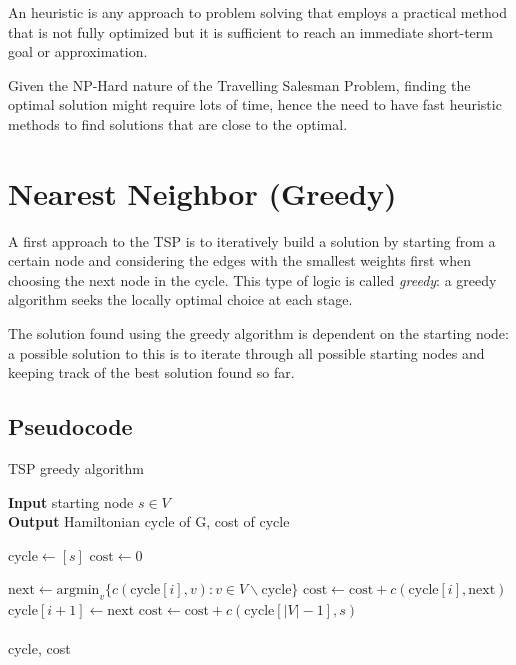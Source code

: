 An heuristic is any approach to problem solving that employs a practical method that is not fully optimized but it is sufficient to reach an immediate short-term goal or approximation.

Given the NP-Hard nature of the Travelling Salesman Problem, finding the optimal solution might require lots of time, hence the need to have fast heuristic methods to find solutions that are close to the optimal.

\section{Nearest Neighbor (Greedy)}

A first approach to the TSP is to iteratively build a solution by starting from a certain node and considering the edges with the smallest weights first when choosing the next node in the cycle. This type of logic is called \textit{greedy}: a greedy algorithm seeks the locally optimal choice at each stage.

The solution found using the greedy algorithm is dependent on the starting node: a possible solution to this is to iterate through all possible starting nodes and keeping track of the best solution found so far.

\newpage

\subsection{Pseudocode}
\begin{algorithm}[h]
    \caption{TSP greedy algorithm}

    \textbf{Input} starting node $s\in V$\\
    \textbf{Output} Hamiltonian cycle of G, cost of cycle\\
    \begin{algorithmic}

        \State $\mbox{cycle} \gets [s]$
        \State $\mbox{cost} \gets 0$
        
            \State $\mbox{next}\gets\mbox{argmin}_v\{c(\mbox{cycle}[i],v) : v\in V \smallsetminus \mbox{cycle}\}$
            \State $\mbox{cost}\gets\mbox{cost}+c(\mbox{cycle}[i], \mbox{next})$
            \State $\mbox{cycle}[i+1]\gets\mbox{next}$
        \EndFor
        \State $\mbox{cost}\gets\mbox{cost}+c(\mbox{cycle}[|V|-1],s)$\\\\
        \Return cycle, cost
    \end{algorithmic}
\end{algorithm}

